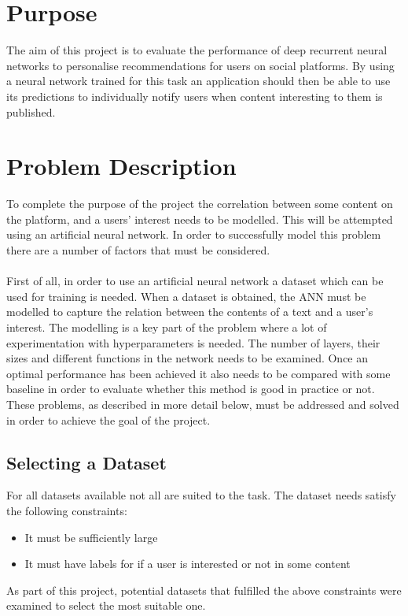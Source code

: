 \section{Purpose}
The aim of this project is to evaluate the performance of deep recurrent neural networks to personalise recommendations for users on social platforms. By using a neural network trained for this task an application should then be able to use its predictions to individually notify users when content interesting to them is published.

\section{Problem Description}
To complete the purpose of the project the correlation between some content on the platform, and a users' interest needs to be modelled. This will be attempted using an artificial neural network. In order to successfully model this problem there are a number of factors that must be considered.
\\\\
First of all, in order to use an artificial neural network a dataset which can be used for training is needed. When a dataset is obtained, the ANN must be modelled to capture the relation between the contents of a text and a user's interest. The modelling is a key part of the problem where a lot of experimentation with hyperparameters is needed. The number of layers, their sizes and different functions in the network needs to be examined. Once an optimal performance has been achieved it also needs to be compared with some baseline in order to evaluate whether this method is good in practice or not. These problems, as described in more detail below,  must be addressed and solved in order to achieve the goal of the project.

\subsection{Selecting a Dataset}\label{sec:select_dataset}
For all datasets available not all are suited to the task. The dataset needs satisfy the following constraints: 
\vspace*{0.25cm}
\begin{itemize}
    \item It must be sufficiently large
    \item It must have labels for if a user is interested or not in some content
\end{itemize}
\vspace*{0.25cm}
As part of this project, potential datasets that fulfilled the above constraints were examined to select the most suitable one.

